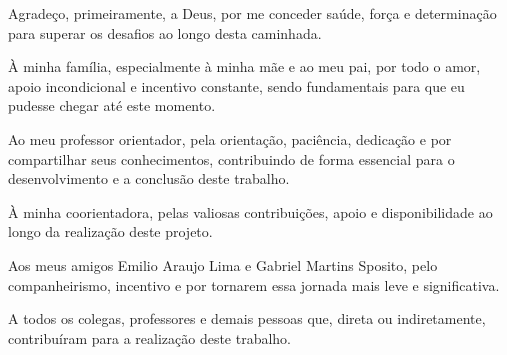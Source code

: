 %
%

\begin{agradecimentos}

Agradeço, primeiramente, a Deus, por me conceder saúde, força e determinação para superar os desafios ao longo desta caminhada.

À minha família, especialmente à minha mãe e ao meu pai, por todo o amor, apoio incondicional e incentivo constante, sendo fundamentais para que eu pudesse chegar até este momento.

Ao meu professor orientador, pela orientação, paciência, dedicação e por compartilhar seus conhecimentos, contribuindo de forma essencial para o desenvolvimento e a conclusão deste trabalho.

À minha coorientadora, pelas valiosas contribuições, apoio e disponibilidade ao longo da realização deste projeto.

Aos meus amigos Emilio Araujo Lima e Gabriel Martins Sposito, pelo companheirismo, incentivo e por tornarem essa jornada mais leve e significativa.

A todos os colegas, professores e demais pessoas que, direta ou indiretamente, contribuíram para a realização deste trabalho.

\end{agradecimentos}